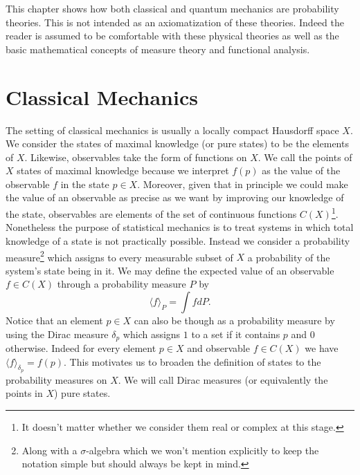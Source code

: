 This chapter shows how both classical and quantum mechanics are probability theories. This is not intended as an axiomatization of these theories. Indeed the reader is assumed to be comfortable with these physical theories as well as the basic mathematical concepts of measure theory and functional analysis.

\section{Classical Mechanics}\label{sec:classical_probability}

The setting of classical mechanics is usually a locally compact Hausdorff space $X$. We consider the states of maximal knowledge (or pure states) to be the elements of $X$. Likewise, observables take the form of functions on $X$. We call the points of $X$ states of maximal knowledge because we interpret $f(p)$ as the value of the observable $f$ in the state $p\in X$. Moreover, given that in principle we could make the value of an observable as precise as we want by improving our knowledge of the state, observables are elements of the set of continuous functions $C(X)$\footnote{It doesn't matter whether we consider them real or complex at this stage.}. Nonetheless the purpose of statistical mechanics is to treat systems in which total knowledge of a state is not practically possible. Instead we consider a probability measure\footnote{Along with a $\sigma$-algebra which we won't mention explicitly to keep the notation simple but should always be kept in mind.} which assigns to every measurable subset of $X$ a probability of the system's state being in it. We may define the expected value of an observable $f\in C(X)$ through a probability measure $P$ by 
\begin{equation}\label{eq:classical_states}
\langle f \rangle_P = \int fdP.
\end{equation}  
Notice that an element $p\in X$ can also be though as a probability measure by using the Dirac measure $\delta_p$ which assigns $1$ to a set if it contains $p$ and $0$ otherwise. Indeed for every element $p \in X$ and observable $f \in C(X)$ we have $\langle f \rangle_{\delta_p} = f(p)$. This motivates us to broaden the definition of states to the probability measures on $X$. We will call Dirac measures (or equivalently the points in $X$) pure states.

